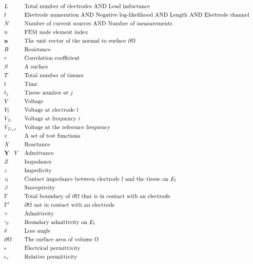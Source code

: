 \pagebreak
\begin{align*}
	&L &&\text{Total number of electrodes AND Lead inductance}\\
	&l &&\text{Electrode numeration AND Negative log-likelihood AND Length AND Electrode channel}\\
	&N &&\text{Number of current sources AND Number of measurements}\\
	&n &&\text{FEM node element index}\\
	&\mathbf{n} &&\text{The unit vector of the normal to surface } \partial \Omega \\
	&R &&\text{Resistance}\\
	&r &&\text{Correlation coefficient}\\
	&S &&\text{A surface}\\
	&T &&\text{Total number of tissues}\\
	&t &&\text{Time}\\
	&t_j &&\text{Tissue number at } j\\
	&V &&\text{Voltage}\\		
	&V_l &&\text{Voltage at electrode } l \\	
	&V_{f_i} &&\text{Voltage at frequency } i \\
	&V_{f_{ref}} &&\text{Voltage at the reference frequency}\\
	&v &&\text{A set of test functions}\\
	&X &&\text{Reactance}\\
	&\mathbf{Y} \text{\textcolor{white}{iii}} Y &&\text{Admittance}\\
	&Z &&\text{Impedance}\\
	&z &&\text{Impedivity}\\
	&z_l &&\text{Contact impedance between electrode } l \text{ and the tissue on } E_l \\
	&\beta &&\text{Susceptivity}\\
	&\Gamma &&\text{Total boundary of } \partial \Omega \text{ that is in contact with an electrode}\\
	&\Gamma ' &&\partial \Omega \text{ not in contact with an electrode}\\
	&\gamma && \text{Admittivity}\\
	&\gamma_l && \text{Boundary admittivity on } E_l \\
	&\delta &&\text{Loss angle}\\
	&\partial \Omega &&\text{The surface area of volume } \Omega \\
	&\epsilon &&\text{Electrical permittivity}\\
	&\epsilon_r &&\text{Relative permittivity}\\
\end{align*}

